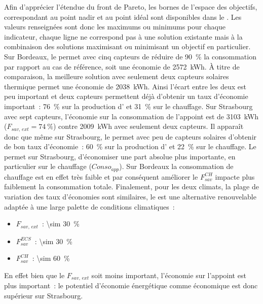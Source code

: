 Afin d’apprécier l’étendue du front de Pareto, les bornes de l’espace des objectifs,
correspondant au point nadir et au point idéal sont disponibles dans le
 . Les valeurs renseignées sont donc les maximums ou
minimums pour chaque indicateur, chaque ligne ne correspond pas à une solution existante
mais à la combinaison des solutions maximisant ou minimisant un objectif en particulier.
Sur Bordeaux, le  permet avec cinq capteurs de réduire de
\SI{90}{\percent} la consommation par rapport au cas de référence, soit une économie de
\SI{2572}{kWh}. À titre de comparaison, la meilleure solution avec
seulement deux capteurs solaires thermique permet une économie de \SI{2038}{kWh}. Ainsi
l’écart entre les deux est peu important et deux capteurs permettent déjà d’obtenir un taux
d’économie important~: \SI{76}{\percent} sur la production d’ et
\SI{31}{\percent} sur le chauffage. Sur Strasbourg avec sept capteurs, l’économie
sur la consommation de l’appoint  est de \SI{3103}{kWh} ($F_{sav,\, ext} = \SI{74}{\percent}$)
contre \SI{2009}{kWh} avec seulement deux capteurs. Il apparaît donc que même sur Strasbourg, le
 permet avec peu de capteurs solaires d’obtenir de bon taux d’économie~:
\SI{60}{\percent} sur la production d’ et \SI{22}{\percent} sur le chauffage.
Le  permet sur Strasbourg, d’économiser une part absolue plus importante, en
particulier sur le chauffage ($Conso_{app}$). Sur Bordeaux la consommation de chauffage
est en effet très faible et par conséquent améliorer le $F_{sav}^{CH}$ impacte plus
faiblement la consommation totale. Finalement, pour les deux climats, la plage de
variation des taux d’économies sont similaires, le  est une alternative
renouvelable adaptée à une large palette de conditions climatiques~:
\begin{itemize}
    \item $F_{sav,\, ext}$~: \SI{\sim 30}{\percent}
    \item $F_{sav}^{ECS}$~: \SI{\sim 30}{\percent}
    \item $F_{sav}^{CH}$~: \SI{\sim 60}{\percent}
\end{itemize}
En effet bien que le $F_{sav,\, ext}$ soit moins important, l’économie sur l’appoint
est plus important~: le potentiel d’économie énergétique comme économique est donc supérieur
sur Strasbourg.

